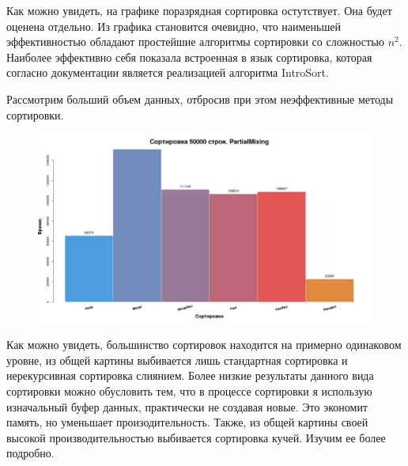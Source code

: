 \documentclass[a4paper, 14pt]{report}
\begin{document}
Как можно увидеть, на графике поразрядная сортировка остутствует. Она будет оценена отдельно.
Из графика становится очевидно, что наименьшей эффективностью обладают простейшие алгоритмы сортировки со сложностью ${n^2}$. Наиболее эффективно себя показала встроенная в язык сортировка, которая согласно документации является реализацией алгоритма IntroSort.

Рассмотрим больший объем данных, отбросив при этом неэффективные методы сортировки.

\begin{figure}[h]
	
	\centering
	
	\includegraphics[width=0.8\linewidth]{./images/big_str.png}
	
	
	\label{fig:mpr}
	
\end{figure}

Как можно увидеть, большинство сортировок находится на примерно одинаковом уровне, из общей картины выбивается лишь стандартная сортировка и нерекурсивная сортировка слиянием. Более низкие результаты данного вида сортировки можно обусловить тем, что в процессе сортировки я использую изначальный буфер данных, практически не создавая новые. Это экономит память, но уменьшает произодительность. Также, из общей картины своей высокой производительностью выбивается сортировка кучей. Изучим ее более подробно.
\end{document}
